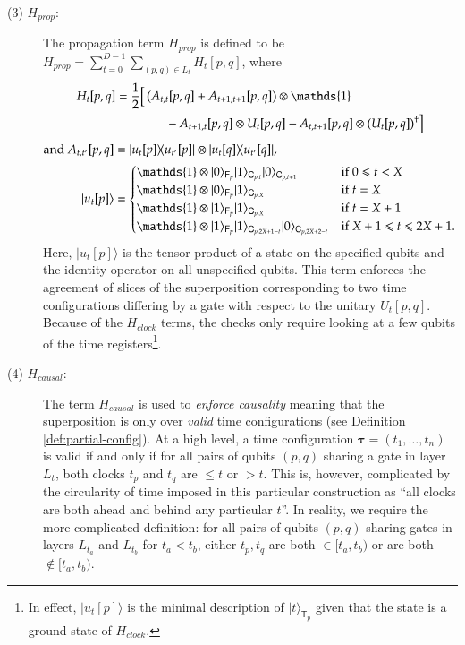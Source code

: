 \documentclass[11pt,letterpaper]{article}
\theoremstyle{definition}
\theoremstyle{remark}
\renewcommand{\leq}{\leqslant}
\numberwithin{equation}{section}
\theoremstyle{definition}
\newcommand{\Id}{\mathop{\mathds{1}}\!\mathinner{}}
\newcommand{\ket}[1]{|#1\rangle}
\newcommand{\ketbra}[2]{|#1\rangle\! \langle #2|}
\newcommand{\sC}{{\mathsf{C}}}
\newcommand{\sF}{{\mathsf{F}}}
\newcommand{\sT}{{\mathsf{T}}}
\newcommand{\timeconfig}{{\bm{\tau}}}
\begin{document}
\begin{description}
\item[(3) $H_{prop}$: ] The propagation term $H_{prop}$ is defined to be $H_{prop} =\sum_{t = 0}^{D-1} \sum_{(p,q) \in L_t} H_t[p,q]$, where 
\begin{equation}
\begin{aligned}
%
%
%
%
%
%
%
\label{eq:prop_term2}
H_t[p,q] &= \frac{1}{2} \Big[ \left( A_{t,t}[p,q] + A_{t+1,t+1}[p,q] \right) \otimes \Id \\
& \qquad  \qquad - A_{t+1,t}[p,q] \otimes U_t[p,q] - A_{t,t+1}[p,q] \otimes (U_t[p,q])^\dagger \Big ]
\end{aligned}
\end{equation}
\begin{align}
\text{and } A_{t,t'}[p,q] &= \ketbra{u_t[p]}{u_{t'}[p]} \otimes \ketbra{u_t[q]}{u_{t'}[q]}, \\
\ket{u_t[p]} &= 
\begin{cases}
\Id \otimes \ket{0}_{\sF_p} \ket{1}_{\sC_{p,t}} \ket{0}_{\sC_{p,t+1}} & \text{if } 0 \leq t < X \\
\Id \otimes \ket{0}_{\sF_p} \ket{1}_{\sC_{p,X}} & \text{if } t = X \\
\Id \otimes \ket{1}_{\sF_p} \ket{1}_{\sC_{p,X}} & \text{if } t = X + 1 \\
\Id \otimes \ket{1}_{\sF_p} \ket{1}_{\sC_{p,2X+1-t}} \ket{0}_{\sC_{p,2X+2-t}} & \text{if } X + 1 \leq t \leq 2X+1.
\end{cases}
\label{eq:cases_for_h_prop}
\end{align}
Here, $\ket{u_t[p]}$ is the tensor product of a state on the specified qubits and the identity operator on all unspecified qubits. This term enforces the agreement of slices of the superposition corresponding to two time configurations differing by a gate with respect to the unitary $U_t[p,q]$. Because of the $H_{clock}$ terms, the checks only require looking at a few qubits of the time registers\footnote{In effect, $\ket{u_t[p]}$ is the minimal description of $\ket{t}_{\sT_p}$ given that the state is a ground-state of $H_{clock}$.}. 
%
%
%
%
%
%
%
%
%
%
%
%

%


\item[(4) $H_{causal}$: ] The term $H_{causal}$ is used to \emph{enforce causality} meaning that the superposition is only over \emph{valid} time configurations (see Definition \ref{def:partial-config}). At a high level, a time configuration $\timeconfig = (t_1, \ldots, t_n)$ is valid if and only if for all pairs of qubits $(p,q)$ sharing a gate in layer $L_t$, both clocks $t_p$ and $t_q$ are $\leq t$ or $> t$. This is, however, complicated by the circularity of time imposed in this particular construction as ``all clocks are both ahead and behind any particular $t$''. In reality, we require the more complicated definition: for all pairs of qubits $(p,q)$ sharing gates in layers $L_{t_a}$ and $L_{t_b}$ for $t_a < t_b$, either $t_p, t_q$ are both $\in [t_a, t_b)$ or are both $\notin [t_a, t_b)$. 


\end{description}
\end{document}
